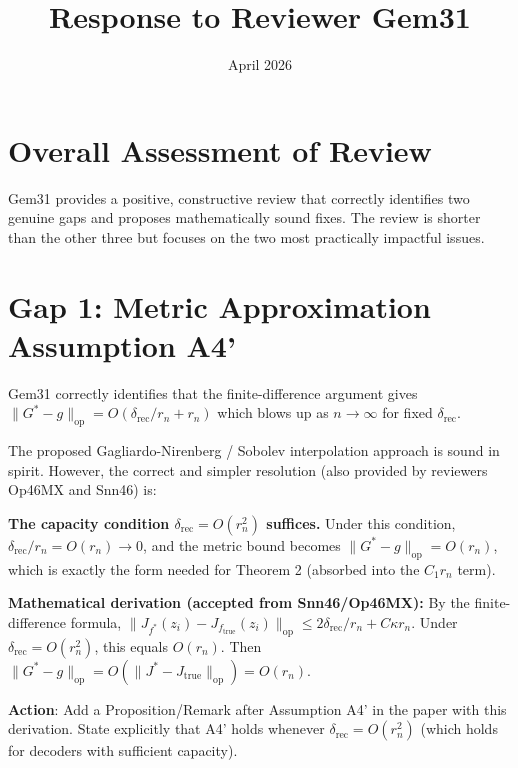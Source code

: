 \documentclass{article}
\title{Response to Reviewer Gem31}
\date{April 2026}
\begin{document}
\maketitle

\section{Overall Assessment of Review}

Gem31 provides a positive, constructive review that correctly identifies two
genuine gaps and proposes mathematically sound fixes. The review is shorter
than the other three but focuses on the two most practically impactful issues.

\section{Gap 1: Metric Approximation Assumption A4'}

\begin{accept}
Gem31 correctly identifies that the finite-difference argument gives
$\|G^* - g\|_{\mathrm{op}} = O(\delta_{\mathrm{rec}}/r_n + r_n)$ which blows
up as $n \to \infty$ for fixed $\delta_{\mathrm{rec}}$.

The proposed Gagliardo-Nirenberg / Sobolev interpolation approach is sound in
spirit. However, the correct and simpler resolution (also provided by reviewers
Op46MX and Snn46) is:

\textbf{The capacity condition $\delta_{\mathrm{rec}} = O(r_n^2)$ suffices.}
Under this condition, $\delta_{\mathrm{rec}}/r_n = O(r_n) \to 0$, and the
metric bound becomes $\|G^* - g\|_{\mathrm{op}} = O(r_n)$, which is exactly
the form needed for Theorem 2 (absorbed into the $C_1 r_n$ term).

\textbf{Mathematical derivation (accepted from Snn46/Op46MX):}
By the finite-difference formula, $\|J_{f^*}(z_i) - J_{f_{\mathrm{true}}}(z_i)\|_{\mathrm{op}}
\leq 2\delta_{\mathrm{rec}}/r_n + C\kappa r_n$. Under $\delta_{\mathrm{rec}}
= O(r_n^2)$, this equals $O(r_n)$. Then $\|G^* - g\|_{\mathrm{op}} =
O(\|J^* - J_{\mathrm{true}}\|_{\mathrm{op}}) = O(r_n)$.

\textbf{Action}: Add a Proposition/Remark after Assumption A4' in the paper
with this derivation. State explicitly that A4' holds whenever
$\delta_{\mathrm{rec}} = O(r_n^2)$ (which holds for decoders with sufficient
capacity).
\end{accept}
\end{document}

